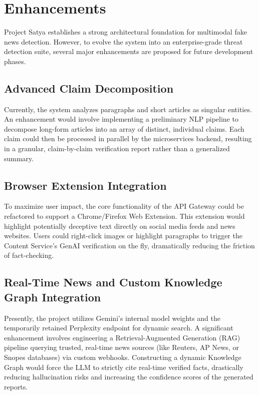 \chapter{Enhancements}

Project Satya establishes a strong architectural foundation for multimodal fake news detection. However, to evolve the system into an enterprise-grade threat detection suite, several major enhancements are proposed for future development phases.

\section{Advanced Claim Decomposition}
Currently, the system analyzes paragraphs and short articles as singular entities. An enhancement would involve implementing a preliminary NLP pipeline to decompose long-form articles into an array of distinct, individual claims. Each claim could then be processed in parallel by the microservices backend, resulting in a granular, claim-by-claim verification report rather than a generalized summary.

\section{Browser Extension Integration}
To maximize user impact, the core functionality of the API Gateway could be refactored to support a Chrome/Firefox Web Extension. This extension would highlight potentially deceptive text directly on social media feeds and news websites. Users could right-click images or highlight paragraphs to trigger the Content Service's GenAI verification on the fly, dramatically reducing the friction of fact-checking.

\section{Real-Time News and Custom Knowledge Graph Integration}
Presently, the project utilizes Gemini’s internal model weights and the temporarily retained Perplexity endpoint for dynamic search. A significant enhancement involves engineering a Retrieval-Augmented Generation (RAG) pipeline querying trusted, real-time news sources (like Reuters, AP News, or Snopes databases) via custom webhooks. Constructing a dynamic Knowledge Graph would force the LLM to strictly cite real-time verified facts, drastically reducing hallucination risks and increasing the confidence scores of the generated reports.

